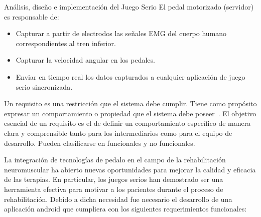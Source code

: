 \begin{thesischapter}{2} {Análisis, diseño e implementación del Juego Serio}
    \vspace{10pt}
    El pedal motorizado (servidor) es responsable de:
    \begin{itemize}
        \item Capturar a partir de electrodos las señales EMG del cuerpo humano correspondientes al tren inferior.
        \item Capturar la velocidad angular en los pedales.
        \item Enviar en tiempo real los datos capturados a cualquier aplicación de juego serio sincronizada.
    \end{itemize}
    
    Un requisito es una restricción que el sistema debe cumplir. Tiene como propósito expresar un comportamiento o propiedad que 
    el sistema debe poseer~\cite{jacobson2000uml}. El objetivo esencial de un requisito es el de definir un comportamiento específico 
    de manera clara y comprensible tanto para los intermediarios como para el equipo de desarrollo. Pueden clasificarse en funcionales 
    y no funcionales.

    La integración de tecnologías de pedalo en el campo de la rehabilitación neuromuscular ha abierto nuevas oportunidades 
    para mejorar la calidad y eficacia de las terapias. En particular, los juegos serios han demostrado ser una herramienta 
    efectiva para motivar a los pacientes durante el proceso de rehabilitación. Debido a dicha necesidad fue necesario   
    el desarrollo de una aplicación android que cumpliera con los siguientes requerimientos funcionales:


\end{thesischapter}
